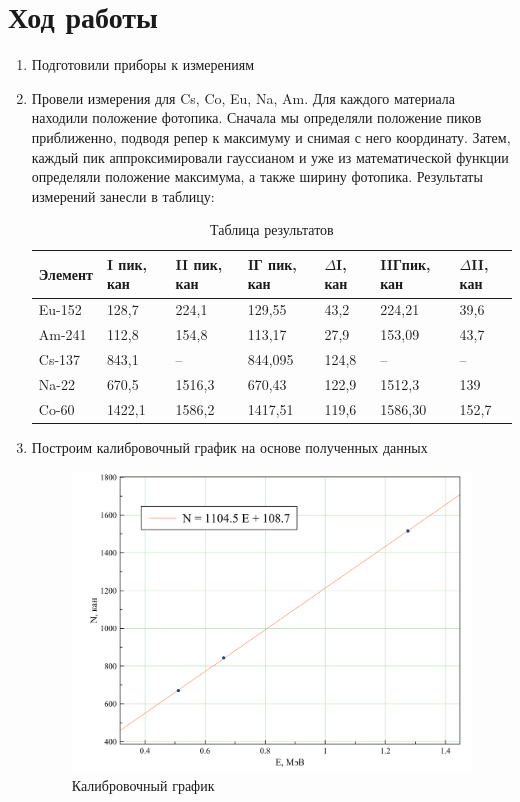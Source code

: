 \documentclass[a4paper,12pt]{article}
\begin{document}
	\section{Ход работы}
	\begin{enumerate}
		\item Подготовили приборы к измерениям
		
		\item Провели измерения для Cs, Co, Eu, Na, Am. Для каждого материала находили положение фотопика. Сначала мы определяли положение пиков приближенно, подводя репер к максимуму и снимая с него координату. Затем, каждый пик аппроксимировали гауссианом и уже из математической функции определяли положение максимума, а также ширину фотопика. Результаты измерений занесли в таблицу:
		
		    \begin{table}[h!]
		    	\centering
		    	\label{my-label}
		    	\begin{tabular}{|l|l|l|l|l|l|l|}
		    		\hline
		    		Элемент & I пик, кан &II пик, кан &IГ пик, кан &$\Delta$I, кан &IIГпик, кан&$\Delta$II, кан \\ \hline
		    		Eu-152 &128,7 &224,1&129,55&43,2&224,21&39,6\\ \hline
		    		Am-241 &112,8&154,8&113,17&27,9&153,09&43,7\\ \hline
		    		Cs-137 &843,1&--&844,095&124,8&--&--\\ \hline
		    		Na-22 &670,5&1516,3&670,43&122,9&1512,3&139\\ \hline
		    		Co-60 &1422,1&1586,2&1417,51&119,6&1586,30&152,7\\ \hline
		    	\end{tabular}
		    	\caption{Таблица результатов}
		    \end{table}
		    
		\item Построим калибровочный график на основе полученных данных
			 \begin{figure}
			 	\centering
			 	\includegraphics[width=0.8\linewidth]{calib}
			 		\caption{Калибровочный график}
			 \end{figure}
			

\end{enumerate}
\end{document}
